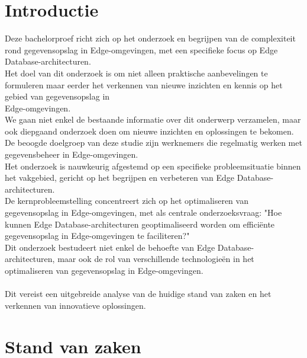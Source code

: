 
\section{Introductie}%
\label{sec:introductie}

Deze bachelorproef richt zich op het onderzoek en begrijpen van de complexiteit rond gegevensopslag in Edge-omgevingen,
 met een specifieke focus op Edge Database-architecturen. \\
 
Het doel van dit onderzoek is om niet alleen praktische aanbevelingen te formuleren maar eerder het verkennen van
nieuwe inzichten en kennis op het gebied van gegevensopslag in \\ Edge-omgevingen. \\

We gaan niet enkel de bestaande informatie over dit onderwerp verzamelen, maar ook diepgaand onderzoek doen
 om nieuwe inzichten en oplossingen te bekomen. \\

De beoogde doelgroep van deze studie zijn werknemers die regelmatig werken met gegevensbeheer in Edge-omgevingen. \\

Het onderzoek is nauwkeurig afgestemd op een specifieke probleemsituatie binnen het vakgebied,
 gericht op het begrijpen en verbeteren van Edge Database-architecturen. \\

De kernprobleemstelling concentreert zich op het optimaliseren van gegevensopslag in Edge-omgevingen,
 met als centrale onderzoeksvraag: 
 "Hoe kunnen Edge Database-architecturen geoptimaliseerd worden om efficiënte gegevensopslag in Edge-omgevingen te faciliteren?" \\

Dit onderzoek bestudeert niet enkel de behoefte van Edge Database-architecturen,
maar ook de rol van verschillende technologieën
  in het optimaliseren van gegevensopslag in Edge-omgevingen. \\ \\

Dit vereist een uitgebreide analyse van de huidige stand van zaken en het verkennen van innovatieve oplossingen.


\section{Stand van zaken}%
\label{sec:state-of-the-art}

